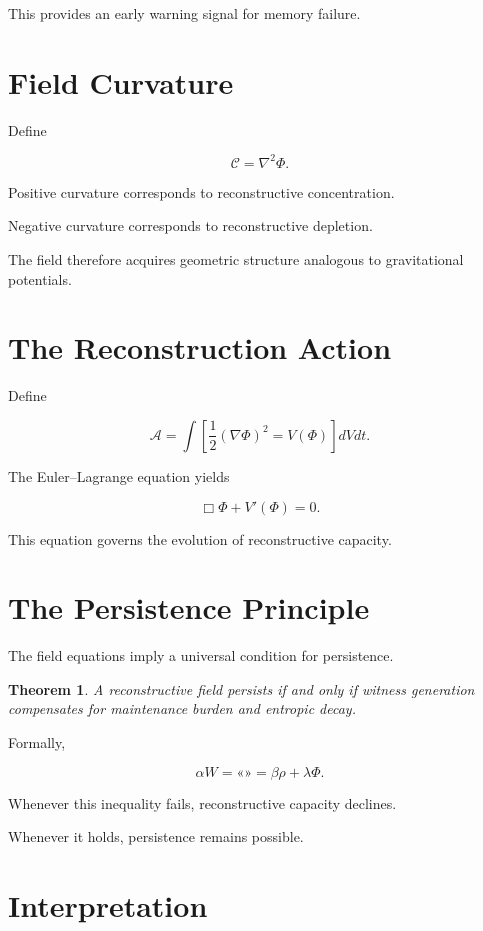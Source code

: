 \documentclass[12pt,oneside]{book}
\theoremstyle{plain} \newtheorem{theorem}{Theorem}[chapter] \newtheorem{lemma}[theorem]{Lemma} \newtheorem{proposition}[theorem]{Proposition} \newtheorem{corollary}[theorem]{Corollary}
\theoremstyle{definition} \newtheorem{definition}[theorem]{Definition} \newtheorem{axiom}[theorem]{Axiom} \newtheorem{construction}[theorem]{Construction}
\theoremstyle{remark} \newtheorem{remark}[theorem]{Remark} \newtheorem{example}[theorem]{Example}
\begin{document}
This provides an early warning signal for memory failure.

\section{Field Curvature}

Define

\[
\mathcal C
=
\nabla^2\Phi.
\]

Positive curvature corresponds to reconstructive concentration.

Negative curvature corresponds to reconstructive depletion.

The field therefore acquires geometric structure analogous to gravitational potentials.

\section{The Reconstruction Action}

Define

\[
\mathcal A
=
\int
\left[
\frac12
(\nabla\Phi)^2
=
V(\Phi)
\right]
dVdt.
\]

The Euler--Lagrange equation yields

\[
\Box\Phi
+
V'(\Phi)
=
0. 

\]

This equation governs the evolution of reconstructive capacity.

\section{The Persistence Principle}

The field equations imply a universal condition for persistence.

\begin{theorem}

A reconstructive field persists if and only if witness generation compensates for maintenance burden and entropic decay.

\end{theorem}

Formally,

\[
\alpha W
=
«»
=
\beta\rho
+
\lambda\Phi.
\]

Whenever this inequality fails, reconstructive capacity declines.

Whenever it holds, persistence remains possible.

\section{Interpretation}
\end{document}
